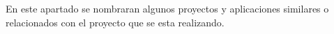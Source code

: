 
En este apartado se nombraran algunos proyectos y aplicaciones similares o relacionados con el proyecto que se esta realizando.

